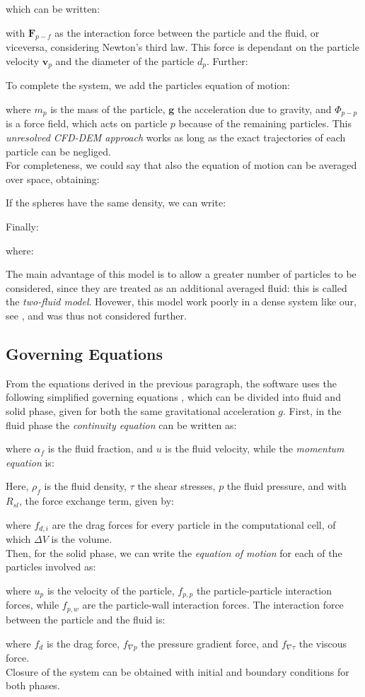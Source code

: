
which can be written:

with $\mathbf{F}_{p-f}$ as the interaction force between the particle and the
fluid, or viceversa, considering Newton's third law.
This force is dependant on the particle
velocity $\mathbf{v}_{p}$ and the diameter of the particle $d_p$. Further:

To complete the system, we add the particles equation of motion:

where $m_p$ is the mass of the particle, $\mathbf{g}$ the acceleration due to
gravity, and $\Phi_{p-p}$ is a force field, which acts on particle $p$ because
of the remaining particles.
This \textit{unresolved \acs{CFD}-\acs{DEM} approach} works as long as the exact
trajectories of each particle can be negliged.\\
For completeness, we could say that also the equation of motion can be averaged
over space, obtaining:

If the spheres have the same density, we can write:

Finally:

where:

The main advantage of this model is to allow a greater number of particles to be
considered, since they are treated as an additional averaged fluid: this is
called the \textit{two-fluid model}.
Hovewer, this model work poorly in a dense system like our, see
\citet{Refworks:202}, and was thus not considered further.

\subsection{Governing Equations}
\label{subsec:governingequations}
From the equations derived in the previous paragraph, the software uses the
following simplified governing equations \cite{Refworks:202}, which can be
divided into fluid and solid phase, given for both the same gravitational
acceleration $g$.
First, in the fluid phase the \textit{continuity equation} can be written as:

where $\alpha_f$ is the fluid fraction, and $u$ is the fluid velocity, while the
\textit{momentum equation} is:

Here, $\rho_f$ is the fluid density, $\tau$ the shear stresses, $p$ the fluid
pressure, and with $R_{sl}$, the force exchange term, given by:

where $f_{d,i}$ are the drag forces for every particle in the computational
cell, of which $\Delta V$ is the volume. \\
Then, for the solid phase, we can write the \textit{equation of motion} for each
of the particles involved as:

where $u_p$ is the velocity of the particle, $f_{p,p}$ the
particle-particle interaction forces, while $f_{p,w}$ are the particle-wall
interaction forces. The interaction force between the particle and the
fluid is:

where $f_d$ is the drag force, $f_{\nabla p}$ the pressure gradient force,
and $f_{\nabla \tau}$ the viscous force.\\
Closure of the system can be obtained with initial and
boundary conditions for both phases.

